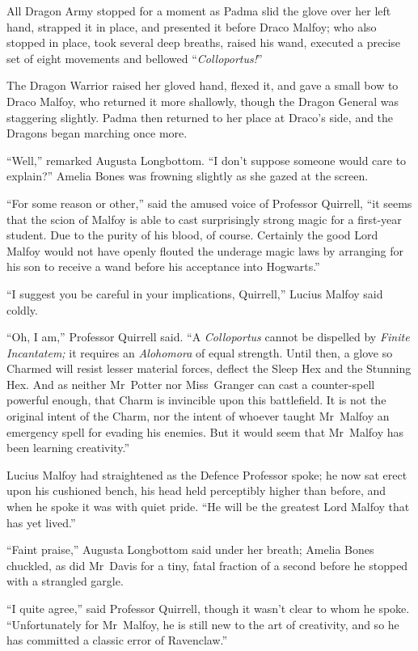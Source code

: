 All Dragon Army stopped for a moment as Padma slid the glove over her left hand, strapped it in place, and presented it before Draco Malfoy; who also stopped in place, took several deep breaths, raised his wand, executed a precise set of eight movements and bellowed “\emph{Colloportus!}”

The Dragon Warrior raised her gloved hand, flexed it, and gave a small bow to Draco Malfoy, who returned it more shallowly, though the Dragon General was staggering slightly. Padma then returned to her place at Draco’s side, and the Dragons began marching once more.

“Well,” remarked Augusta Longbottom. “I don’t suppose someone would care to explain?” Amelia Bones was frowning slightly as she gazed at the screen.

“For some reason or other,” said the amused voice of Professor Quirrell, “it seems that the scion of Malfoy is able to cast surprisingly strong magic for a first-year student. Due to the purity of his blood, of course. Certainly the good Lord Malfoy would not have openly flouted the underage magic laws by arranging for his son to receive a wand before his acceptance into Hogwarts.”

“I suggest you be careful in your implications, Quirrell,” Lucius Malfoy said coldly.

“Oh, I am,” Professor Quirrell said. “A \emph{Colloportus} cannot be dispelled by \emph{Finite Incantatem;} it requires an \emph{Alohomora} of equal strength. Until then, a glove so Charmed will resist lesser material forces, deflect the Sleep Hex and the Stunning Hex. And as neither Mr~Potter nor Miss~Granger can cast a counter-spell powerful enough, that Charm is invincible upon this battlefield. It is not the original intent of the Charm, nor the intent of whoever taught Mr~Malfoy an emergency spell for evading his enemies. But it would seem that Mr~Malfoy has been learning creativity.”

Lucius Malfoy had straightened as the Defence Professor spoke; he now sat erect upon his cushioned bench, his head held perceptibly higher than before, and when he spoke it was with quiet pride. “He will be the greatest Lord Malfoy that has yet lived.”

“Faint praise,” Augusta Longbottom said under her breath; Amelia Bones chuckled, as did Mr~Davis for a tiny, fatal fraction of a second before he stopped with a strangled gargle.

“I quite agree,” said Professor Quirrell, though it wasn’t clear to whom he spoke. “Unfortunately for Mr~Malfoy, he is still new to the art of creativity, and so he has committed a classic error of Ravenclaw.”

